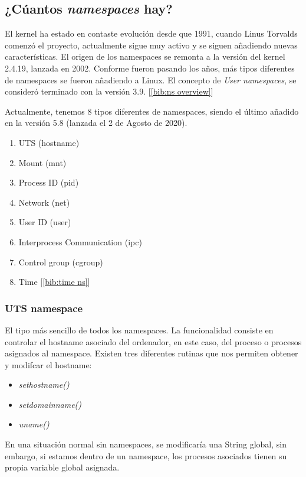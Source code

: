 \documentclass[12pt]{article}
\begin{document}
	\subsection{¿Cúantos \textit{namespaces} hay?}
	\par\noindent El kernel ha estado en contaste evolución desde que 1991, cuando Linus Torvalds comenzó el proyecto, actualmente sigue muy activo y se siguen añadiendo nuevas características. El origen de los namespaces se remonta a la versión del kernel 2.4.19, lanzada en 2002. Conforme fueron pasando los años, más tipos diferentes de namespaces se fueron añadiendo a Linux. El concepto de \textit{User namespaces}, se consideró terminado con la versión 3.9. [\ref{bib:ns overview}]\\
	\par \noindent Actualmente, tenemos 8 tipos diferentes de namespaces, siendo el último añadido en la versión 5.8 (lanzada el 2 de Agosto de 2020). 
	
	\begin{enumerate}
		\item UTS (hostname)
		\item Mount (mnt)
		\item Process ID (pid)
		\item Network (net)
		\item User ID (user) 
		\item Interprocess Communication (ipc)
		\item Control group (cgroup)
		\item Time [\ref{bib:time ns}]
	\end{enumerate}
	
	\pagebreak
	
	\subsubsection{UTS namespace}
	\label{sect: uts namespace}
	\par \noindent El tipo más sencillo de todos los namespaces. La funcionalidad consiste en controlar el hostname asociado del ordenador, en este caso, del proceso o procesos asignados al namespace. Existen tres diferentes rutinas que nos permiten obtener y modifcar el hostname: 
	\begin{itemize}
		\item \textit{sethostname()}
		\item \textit{setdomainname()}
		\item \textit{uname()}
	\end{itemize}
	En una situación normal sin namespaces, se modificaría una String global, sin embargo, si estamos dentro de un namespace, los procesos asociados tienen su propia variable global asignada.\\
	
\end{document}
